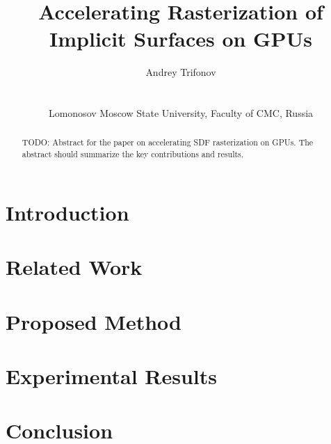\documentclass{egpubl}
\title[Accelerating SDF Rasterization on GPUs]
      {Accelerating Rasterization of Implicit Surfaces on GPUs}
\author[Andrey Trifonov]
{\parbox{\textwidth}{\centering Andrey Trifonov\orcid{0000-0000-0000-0000}}
\\
{\parbox{\textwidth}{\centering Lomonosov Moscow State University, Faculty of CMC, Russia}}
}
\begin{document}
\maketitle

\begin{abstract}
    TODO: Abstract for the paper on accelerating SDF rasterization on GPUs.
    The abstract should summarize the key contributions and results.
\end{abstract}

\section{Introduction}
\label{sec:introduction}


\section{Related Work}
\label{sec:related}


\section{Proposed Method}
\label{sec:method}


\section{Experimental Results}
\label{sec:results}


\section{Conclusion}
\label{sec:conclusion}




\end{document}
